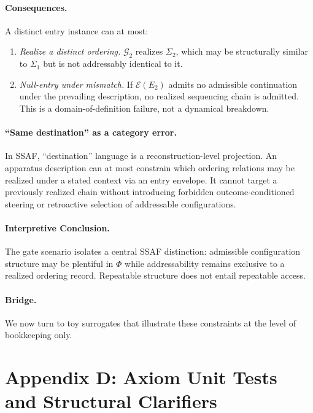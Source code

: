\documentclass[aps,prx,onecolumn,11pt]{revtex4-2}
\theoremstyle{plain}
\theoremstyle{definition}
\theoremstyle{remark}
\begin{document}
\paragraph{Consequences.}
A distinct entry instance can at most:
\begin{enumerate}[label=(\roman*), leftmargin=2.2em]
\item \emph{Realize a distinct ordering.} $\mathcal{G}_2$ realizes
$\Sigma_2$, which may be structurally similar to $\Sigma_1$ but is
not addressably identical to it.
\item \emph{Null-entry under mismatch.} If $\mathcal{E}(E_2)$ admits
no admissible continuation under the prevailing description, no
realized sequencing chain is admitted. This is a domain-of-definition
failure, not a dynamical breakdown.
\end{enumerate}

\paragraph{``Same destination'' as a category error.}
In SSAF, ``destination'' language is a reconstruction-level
projection. An apparatus description can at most constrain which
ordering relations may be realized under a stated context via an entry
envelope. It cannot target a previously realized chain without
introducing forbidden outcome-conditioned steering or retroactive
selection of addressable configurations.

\paragraph{Interpretive Conclusion.}
The gate scenario isolates a central SSAF distinction: admissible
configuration structure may be plentiful in $\Phi$ while
addressability remains exclusive to a realized ordering record.
Repeatable structure does not entail repeatable access.

\paragraph{Bridge.}
We now turn to toy surrogates that illustrate these constraints at the
level of bookkeeping only.

\section{Appendix D: Axiom Unit Tests and Structural Clarifiers}
\label{toy:models}
\end{document}
